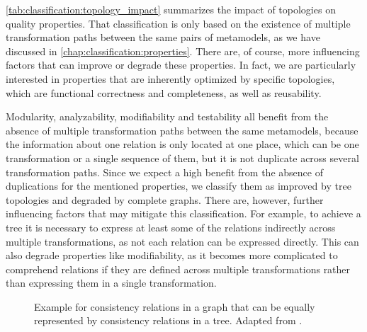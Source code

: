 \autoref{tab:classification:topology_impact} summarizes the impact of topologies on quality properties.
That classification is only based on the existence of multiple transformation paths between the same pairs of metamodels, as we have discussed in \autoref{chap:classification:properties}.
There are, of course, more influencing factors that can improve or degrade these properties.
In fact, we are particularly interested in properties that are inherently optimized by specific topologies, which are functional correctness and completeness, as well as reusability.

Modularity, analyzability, modifiability and testability all benefit from the absence of multiple transformation paths between the same metamodels, because the information about one relation is only located at one place, which can be one transformation or a single sequence of them, but it is not duplicate across several transformation paths.
Since we expect a high benefit from the absence of duplications for the mentioned properties, we classify them as improved by tree topologies and degraded by complete graphs.
There are, however, further influencing factors that may mitigate this classification.
For example, to achieve a tree it is necessary to express at least some of the relations indirectly across multiple transformations, as not each relation can be expressed directly.
This can also degrade properties like modifiability, as it becomes more complicated to comprehend relations if they are defined across multiple transformations rather than expressing them in a single transformation.

\begin{figure}
    \centering
    
    \caption[Equality of graph and tree of consistency relations]{Example for consistency relations in a graph that can be equally represented by consistency relations in a tree. Adapted from .}
    \label{fig:classification:tree_generation}
\end{figure}


